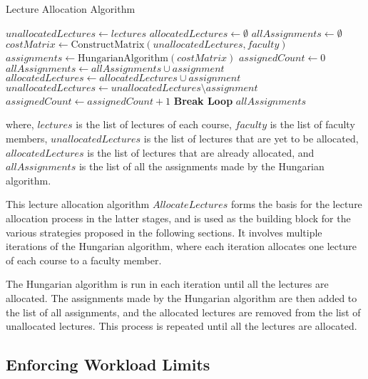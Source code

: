 \begin{algorithm}[H]
  \caption{Lecture Allocation Algorithm}
  \begin{algorithmic}[1]
    \State $unallocatedLectures \gets lectures$
    \State $allocatedLectures \gets \emptyset$
    \State $allAssignments \gets \emptyset$
     
    \State $costMatrix \gets \text{ConstructMatrix}(unallocatedLectures, faculty)$
    \State $assignments \gets \text{HungarianAlgorithm}(costMatrix)$
    \State $assignedCount \gets 0$
    \State $allAssignments \gets allAssignments \cup assignment$
    \State $allocatedLectures \gets allocatedLectures \cup assignment$
    \State $unallocatedLectures \gets unallocatedLectures \setminus assignment$
    \State $assignedCount \gets assignedCount + 1$
    \EndIf
    \EndFor
    \State \textbf{Break Loop}
    \EndIf
    \EndWhile
    \State \Return $allAssignments$
    \EndProcedure
  \end{algorithmic}
  \label{alg:base_lec_alloc}
\end{algorithm}

where, \(lectures\) is the list of lectures of each course, \(faculty\) is the list of faculty members, \(unallocatedLectures\) is the list of lectures that are yet to be allocated, \(allocatedLectures\) is the list of lectures that are already allocated, and \(allAssignments\) is the list of all the assignments made by the Hungarian algorithm.

This lecture allocation algorithm $AllocateLectures$ forms the basis for the lecture allocation process in the latter stages, and is used as the building block for the various strategies proposed in the following sections. It involves multiple iterations of the Hungarian algorithm, where each iteration allocates one lecture of each course to a faculty member.

The Hungarian algorithm is run in each iteration until all the lectures are allocated. The assignments made by the Hungarian algorithm are then added to the list of all assignments, and the allocated lectures are removed from the list of unallocated lectures. This process is repeated until all the lectures are allocated.

\subsection{Enforcing Workload Limits}

